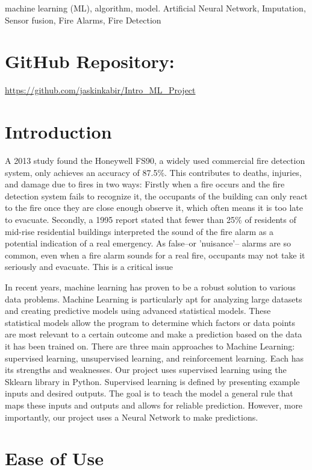 \documentclass[conference]{IEEEtran}
\begin{document}
\begin{IEEEkeywords}
machine learning (ML), algorithm, model. Artificial Neural
Network, Imputation, Sensor fusion, Fire Alarms, Fire
Detection
\end{IEEEkeywords}

\section{GitHub Repository:}
\centering
\url{https://github.com/jaskinkabir/Intro_ML_Project}

\section{Introduction}
A 2013 study found the Honeywell FS90, a widely used
commercial fire detection system, only achieves an accuracy
of 87.5\%\cite{smokeacc}. This contributes to deaths,
injuries, and damage due to fires in two ways: Firstly when
a fire occurs and the fire detection system fails to
recognize it, the occupants of the building can only react
to the fire once they are close enough observe it, which
often means it is too late to evacuate. Secondly, a 1995
report stated that fewer than 25\% of residents of mid-rise
residential buildings interpreted the sound of the fire
alarm as a potential indication of a real
emergency\cite{crywolf}. As false--or 'nuisance'-- alarms
are so common, even when a fire alarm sounds for a real
fire, occupants may not take it seriously and evacuate. This
is a critical issue

In recent years, machine learning has proven to be a robust
solution to various data problems. Machine Learning is
particularly apt for analyzing large datasets and creating
predictive models using advanced statistical models. These
statistical models allow the program to determine which
factors or data points are most relevant to a certain
outcome and make a prediction based on the data it has been
trained on. There are three main approaches to Machine
Learning: supervised learning, unsupervised learning, and
reinforcement learning. Each has its strengths and
weaknesses. Our project uses supervised learning using the
Sklearn library in Python. Supervised learning is defined by
presenting example inputs and desired outputs. The goal is
to teach the model a general rule that maps these inputs and
outputs and allows for reliable prediction. However, more
importantly, our project uses a Neural Network to make
predictions.

\section{Ease of Use}
\end{document}
